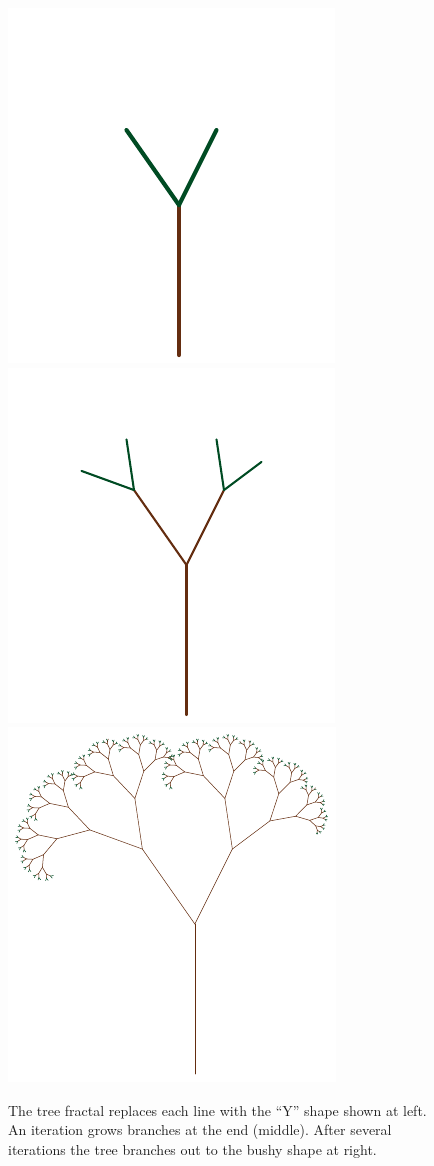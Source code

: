 \begin{figure}[htb]
  \centering
  \includegraphics[scale=1]{images/Tree01}
  \hfill
  \includegraphics[scale=1]{images/Tree02}
  \hfill
  \includegraphics[scale=1]{images/Tree08}
  \caption[The tree fractal.]{
    The tree fractal replaces each line with the ``Y'' shape shown at left.
    An iteration grows branches at the end (middle).
    After several iterations the tree branches out to the bushy shape at right.
  }
  \label{fig:TreeFractal}
\end{figure}

